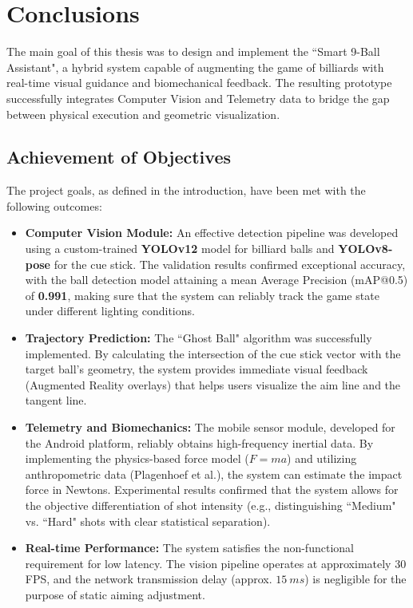 \chapter{Conclusions}

The main goal of this thesis was to design and implement the ``Smart 9-Ball Assistant", a hybrid system capable of augmenting the game of billiards with real-time visual guidance and biomechanical feedback. The resulting prototype successfully integrates Computer Vision and Telemetry data to bridge the gap between physical execution and geometric visualization.

\section{Achievement of Objectives}
The project goals, as defined in the introduction, have been met with the following outcomes:

\begin{itemize}
    \item \textbf{Computer Vision Module:} An effective detection pipeline was developed using a custom-trained \textbf{YOLOv12} model for billiard balls and \textbf{YOLOv8-pose} for the cue stick. The validation results confirmed exceptional accuracy, with the ball detection model attaining a mean Average Precision (mAP@0.5) of \textbf{0.991}, making sure that the system can reliably track the game state under different lighting conditions.
    \item \textbf{Trajectory Prediction:} The ``Ghost Ball" algorithm was successfully implemented. By calculating the intersection of the cue stick vector with the target ball's geometry, the system provides immediate visual feedback (Augmented Reality overlays) that helps users visualize the aim line and the tangent line.
    \item \textbf{Telemetry and Biomechanics:} The mobile sensor module, developed for the Android platform, reliably obtains high-frequency inertial data. By implementing the physics-based force model ($F=ma$) and utilizing anthropometric data (Plagenhoef et al.\cite{bib:anatomical}), the system can estimate the impact force in Newtons. Experimental results confirmed that the system allows for the objective differentiation of shot intensity (e.g., distinguishing ``Medium" vs. ``Hard" shots with clear statistical separation).
    \item \textbf{Real-time Performance:} The system satisfies the non-functional requirement for low latency. The vision pipeline operates at approximately 30 FPS, and the network transmission delay (approx. $15~ms$) is negligible for the purpose of static aiming adjustment.
\end{itemize}

